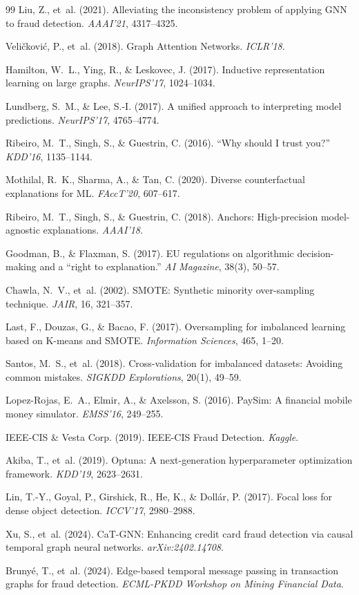 \documentclass[10pt,a4paper,twocolumn]{article}
\begin{document}
{\begin{thebibliography}{99}
Liu, Z., et~al. (2021). Alleviating the inconsistency problem of applying GNN to fraud detection. \textit{AAAI'21}, 4317--4325.

Veli\v{c}kovi\'{c}, P., et~al. (2018). Graph Attention Networks. \textit{ICLR'18}.

Hamilton, W.~L., Ying, R., \& Leskovec, J. (2017). Inductive representation learning on large graphs. \textit{NeurIPS'17}, 1024--1034.

Lundberg, S.~M., \& Lee, S.-I. (2017). A unified approach to interpreting model predictions. \textit{NeurIPS'17}, 4765--4774.

Ribeiro, M.~T., Singh, S., \& Guestrin, C. (2016). ``Why should I trust you?'' \textit{KDD'16}, 1135--1144.

Mothilal, R.~K., Sharma, A., \& Tan, C. (2020). Diverse counterfactual explanations for ML. \textit{FAccT'20}, 607--617.

Ribeiro, M.~T., Singh, S., \& Guestrin, C. (2018). Anchors: High-precision model-agnostic explanations. \textit{AAAI'18}.

Goodman, B., \& Flaxman, S. (2017). EU regulations on algorithmic decision-making and a ``right to explanation.'' \textit{AI Magazine}, 38(3), 50--57.

Chawla, N.~V., et~al. (2002). SMOTE: Synthetic minority over-sampling technique. \textit{JAIR}, 16, 321--357.

Last, F., Douzas, G., \& Bacao, F. (2017). Oversampling for imbalanced learning based on K-means and SMOTE. \textit{Information Sciences}, 465, 1--20.

Santos, M.~S., et~al. (2018). Cross-validation for imbalanced datasets: Avoiding common mistakes. \textit{SIGKDD Explorations}, 20(1), 49--59.

Lopez-Rojas, E.~A., Elmir, A., \& Axelsson, S. (2016). PaySim: A financial mobile money simulator. \textit{EMSS'16}, 249--255.

IEEE-CIS \& Vesta Corp. (2019). IEEE-CIS Fraud Detection. \textit{Kaggle}.

Akiba, T., et~al. (2019). Optuna: A next-generation hyperparameter optimization framework. \textit{KDD'19}, 2623--2631.

Lin, T.-Y., Goyal, P., Girshick, R., He, K., \& Doll\'{a}r, P. (2017). Focal loss for dense object detection. \textit{ICCV'17}, 2980--2988.

Xu, S., et~al. (2024). CaT-GNN: Enhancing credit card fraud detection via causal temporal graph neural networks. \textit{arXiv:2402.14708}.

Bruny\'{e}, T., et~al. (2024). Edge-based temporal message passing in transaction graphs for fraud detection. \textit{ECML-PKDD Workshop on Mining Financial Data}.

\end{thebibliography}
}
\end{document}
